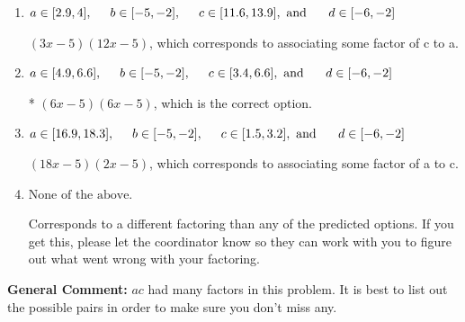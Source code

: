 \documentclass{extbook}[14pt]
\begin{document}
\begin{enumerate}
{\begin{enumerate}[label=\Alph*.]
 $(x -30)(x -30)$, which corresponds to factoring $x^{2} -60 x + 900$.
\item \( a \in [2.9, 4], \hspace*{5mm} b \in [-5, -2], \hspace*{5mm} c \in [11.6, 13.9], \text{ and } \hspace*{5mm} d \in [-6, -2] \)

 $(3x -5)(12x -5)$, which corresponds to associating some factor of c to a.
\item \( a \in [4.9, 6.6], \hspace*{5mm} b \in [-5, -2], \hspace*{5mm} c \in [3.4, 6.6], \text{ and } \hspace*{5mm} d \in [-6, -2] \)

* $(6x -5)(6x -5)$, which is the correct option.
\item \( a \in [16.9, 18.3], \hspace*{5mm} b \in [-5, -2], \hspace*{5mm} c \in [1.5, 3.2], \text{ and } \hspace*{5mm} d \in [-6, -2] \)

 $(18x -5)(2x -5)$, which corresponds to associating some factor of a to c.
\item \( \text{None of the above.} \)

 Corresponds to a different factoring than any of the predicted options. If you get this, please let the coordinator know so they can work with you to figure out what went wrong with your factoring.
\end{enumerate}

\textbf{General Comment:} $ac$ had many factors in this problem. It is best to list out the possible pairs in order to make sure you don't miss any.
}
\end{enumerate}
\end{document}
